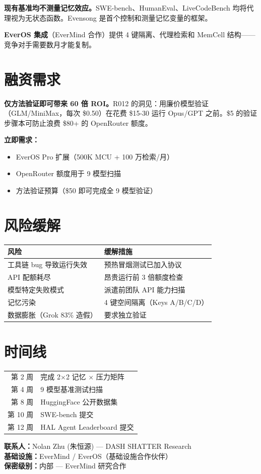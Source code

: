 \documentclass[11pt,a4paper]{article}
\begin{document}
\textbf{现有基准均不测量记忆效应。}SWE-bench、HumanEval、LiveCodeBench 均将代理视为无状态函数。Evensong 是首个控制和测量记忆变量的框架。

\textbf{EverOS 集成}（EverMind 合作）提供 4 键隔离、代理检索和 MemCell 结构——竞争对手需要数月才能复制。

\section{融资需求}

\textbf{仅方法验证即可带来 60 倍 ROI。}R012 的洞见：用廉价模型验证（GLM/MiniMax，每次 \$0.50）在花费 \$15-30 运行 Opus/GPT 之前。\$5 的验证步骤本可防止浪费 \$80+ 的 OpenRouter 额度。

\textbf{立即需求：}
\begin{itemize}
  \item EverOS Pro 扩展（500K MCU + 100 万检索/月）
  \item OpenRouter 额度用于 9 模型扫描
  \item 方法验证预算（\$50 即可完成全 9 模型验证）
\end{itemize}

\section{风险缓解}

\begin{tabular}{l|l}
风险 & 缓解措施\\\hline
工具链 bug 导致运行失效 & 预热冒烟测试已加入协议\\
API 配额耗尽 & 昂贵运行前 3 倍额度检查\\
模型特定失败模式 & 派遣前团队 API 能力扫描\\
记忆污染 & 4 键空间隔离（Keys A/B/C/D）\\
数据膨胀（Grok 83\% 造假） & 要求独立验证\\
\end{tabular}

\section{时间线}

\begin{tabular}{r|l}
第 2 周 & 完成 2$\times$2 记忆 $\times$ 压力矩阵\\
第 4 周 & 9 模型基准测试扫描\\
第 8 周 & HuggingFace 公开数据集\\
第 10 周 & SWE-bench 提交\\
第 12 周 & HAL Agent Leaderboard 提交\\
\end{tabular}

\vfill

\textbf{联系人：}Nolan Zhu (朱恒源) — DASH SHATTER Research\\
\textbf{基础设施：}EverMind / EverOS（基础设施合作伙伴）\\
\textbf{保密级别：}内部 — EverMind 研究合作
\end{document}
